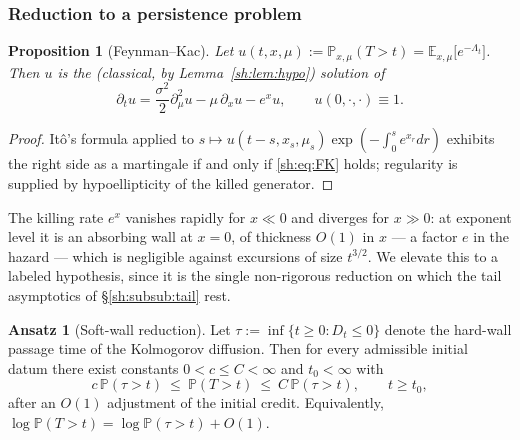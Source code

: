 \documentclass[11pt]{article}
\numberwithin{equation}{section}
\theoremstyle{plain}
\newtheorem{proposition}[theorem]{Proposition}
\theoremstyle{definition}
\newtheorem{ansatz}[theorem]{Ansatz}
\theoremstyle{remark}
\newcommand{\E}{\mathbb{E}}
\newcommand{\PP}{\mathbb{P}}
\begin{document}
\subsubsection{Reduction to a persistence problem}\label{sh:subsub:reduction}

\begin{proposition}[Feynman--Kac]\label{sh:prop:FK}
Let $u(t,x,\mu):=\PP_{x,\mu}(T>t)=\E_{x,\mu}\bigl[e^{-\Lambda_t}\bigr]$.
Then $u$ is the (classical, by Lemma~\ref{sh:lem:hypo}) solution of
\begin{equation}\label{sh:eq:FK}
\partial_tu=\frac{\sigma^2}{2}\partial_\mu^2u-\mu\,\partial_xu-e^{x}u,
\qquad u(0,\cdot,\cdot)\equiv1 .
\end{equation}
\end{proposition}

\begin{proof}
It\^o's formula applied to $s\mapsto
u(t-s,x_s,\mu_s)\exp(-\int_0^se^{x_r}dr)$ exhibits the right side as a
martingale if and only if \eqref{sh:eq:FK} holds; regularity is supplied by
hypoellipticity of the killed generator.
\end{proof}

The killing rate $e^x$ vanishes rapidly for $x\ll0$ and diverges for
$x\gg0$: at exponent level it is an absorbing wall at $x=0$, of thickness
$O(1)$ in $x$ --- a factor $e$ in the hazard --- which is negligible against
excursions of size $t^{3/2}$. We elevate this to a labeled hypothesis, since
it is the single non-rigorous reduction on which the tail asymptotics of
\S\ref{sh:subsub:tail} rest.

\begin{ansatz}[Soft-wall reduction]\label{sh:ansatz}
Let $\tau:=\inf\{t\ge0:D_t\le0\}$ denote the hard-wall passage time of the
Kolmogorov diffusion. Then for every admissible initial datum there exist
constants $0<c\le C<\infty$ and $t_0<\infty$ with
\[
c\,\PP(\tau>t)\ \le\ \PP(T>t)\ \le\ C\,\PP(\tau>t),\qquad t\ge t_0,
\]
after an $O(1)$ adjustment of the initial credit. Equivalently,
$\log\PP(T>t)=\log\PP(\tau>t)+O(1)$.
\end{ansatz}
\end{document}
